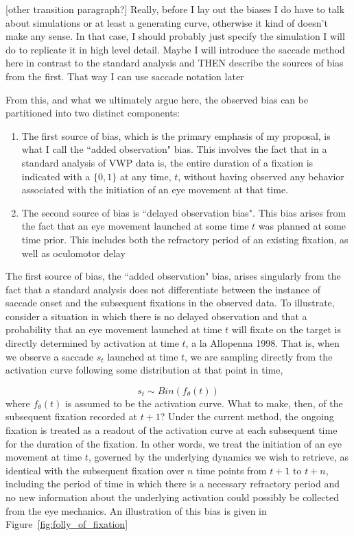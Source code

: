 \documentclass{article}
\begin{document}
[other transition paragraph?] Really, before I lay out the biases I do have to talk about simulations or at least a generating curve, otherwise it kind of doesn't make any sense. In that case, I should probably just specify the simulation I will do to replicate it in high level detail. Maybe I will introduce the saccade method here in contrast to the standard analysis and THEN describe the sources of bias from the first. That way I can use saccade notation later

From this, and what we ultimately argue here, the observed bias can be partitioned into two distinct components:

\begin{singlespace}
\begin{enumerate}
\vspace{-3mm}
\item The first source of bias, which is the primary emphasis of my proposal, is what I call the ``added observation" bias. This involves the fact that in  a standard analysis of VWP data is, the entire duration of a fixation is indicated with a $\{0,1\}$  at any time, $t$, without having observed any behavior associated with the initiation of an eye movement at that time.
\item The second source of bias is ``delayed observation bias". This bias arises from the fact that an eye movement launched at some time $t$ was planned at some time prior. This includes both the refractory period of an existing fixation, as well as oculomotor delay
\end{enumerate}
\end{singlespace}

The first source of bias, the ``added observation" bias, arises singularly from the fact that a standard analysis does not differentiate between the instance of saccade onset and the subsequent fixations in the observed data. To illustrate, consider a situation in which there is no delayed observation and that a probability that an eye movement launched at time $t$ will fixate on the target is directly determined by activation at time $t$, a la Allopenna 1998. That is, when we observe a saccade $s_t$ launched at time $t$, we are sampling directly from the activation curve following some distribution at that point in time, 

\begin{equation} \label{eq:saccade_dist}
s_t \sim Bin(f_{\theta}(t))
\end{equation}
where $f_{\theta}(t)$ is assumed to be the activation curve. What to make, then, of the subsequent fixation recorded at $t+1$? Under the current method, the ongoing fixation is treated as a readout of the activation curve at each subsequent time for the duration of the fixation. In other words, we treat the initiation of an eye movement at time $t$, governed by the underlying dynamics we wish to retrieve, as identical with the subsequent fixation over $n$ time points from $t+1$ to $t+n$, including the period of time in which there is a necessary refractory period and no new information about the underlying activation could possibly be collected from the eye mechanics. An illustration of this bias is given in Figure~\ref{fig:folly_of_fixation}
\end{document}
